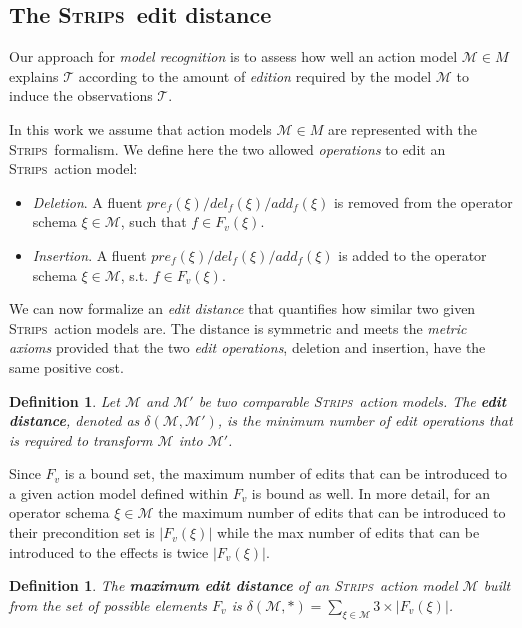\documentclass[letterpaper]{article} %
\newcommand{\strips}{\textsc{Strips}}     %
\newtheorem{definition}[theorem]{Definition}
\begin{document}
\subsection{The \strips\ edit distance}
Our approach for {\em model recognition} is to assess how well an action model $\mathcal{M}\in M$ explains $\mathcal{T}$ according to the amount of {\em edition} required by the model $\mathcal{M}$ to induce the observations $\mathcal{T}$.

In this work we assume that action models $\mathcal{M}\in M$ are represented with the \strips\ formalism. We define here the two allowed \emph{operations} to edit an \strips\ action model:
\begin{itemize}
\item {\em Deletion}. A fluent $pre_f(\xi)/del_f(\xi)/add_f(\xi)$ is removed from the operator schema $\xi\in\mathcal{M}$, such that $f\in F_v(\xi)$.
\item {\em Insertion}. A fluent $pre_f(\xi)/del_f(\xi)/add_f(\xi)$ is added to the operator schema $\xi\in\mathcal{M}$, s.t. $f\in F_v(\xi)$.
\end{itemize}

We can now formalize an {\em edit distance} that quantifies how similar two given \strips\ action models are. The distance is symmetric and meets the {\em metric axioms} provided that the two {\em edit operations}, deletion and insertion, have the same positive cost.

\begin{definition}
  Let $\mathcal{M}$ and $\mathcal{M}'$ be two {\em comparable} \strips\ action models. The {\bf edit distance}, denoted as $\delta(\mathcal{M},\mathcal{M}')$, is the minimum number of {\em edit operations} that is required to transform $\mathcal{M}$ into $\mathcal{M}'$.
\end{definition}

Since $F_v$ is a bound set, the maximum number of edits that can be introduced to a given action model defined within $F_v$ is bound as well. In more detail, for an operator schema $\xi\in\mathcal{M}$ the maximum number of edits that can be introduced to their precondition set is $|F_v(\xi)|$ while the max number of edits that can be introduced to the effects is twice $|F_v(\xi)|$.
\begin{definition}
The \textbf{maximum edit distance} of an \strips\ action model $\mathcal{M}$ built from the set of possible elements $F_v$ is $\delta(\mathcal{M},*)=\sum_{\xi\in\mathcal{M}} 3\times|F_v(\xi)|$.
\end{definition}
\end{document}

